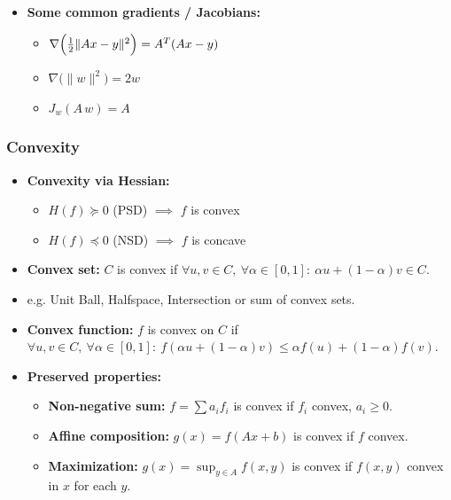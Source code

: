\begin{itemize}
\begin{align}
                  \quad\text{(1st order)},\nonumber                                                 \\
                   & \hspace{-1.5em}f(x)\approx f(x_0)+\langle\nabla f(x_0),\,x-x_0\rangle\nonumber \\
                   & \hspace{-1.5em}\quad+\tfrac12\,(x-x_0)^T\,H(f(x_0))\,(x-x_0)
                  \quad\text{(2nd order)}.\nonumber
            \end{align}
      \item \textbf{Some common gradients / Jacobians:}
            \begin{itemize}
                  \item $\nabla\Bigl(\tfrac12\|Ax-y\|^2\Bigr) = A^T(Ax-y)$
                  \item $\nabla\bigl(\|w\|^2\bigr) = 2w$
                  \item $J_w(A\,w) = A$
            \end{itemize}
\end{itemize}

\subsubsection{Convexity}
\begin{itemize}
      \item \textbf{Convexity via Hessian:}
            \begin{itemize}
                  \item \(H(f)\succeq0\) (PSD) \(\implies\) \(f\) is convex
                  \item \(H(f)\preceq0\) (NSD) \(\implies\) \(f\) is concave
            \end{itemize}
      \item \textbf{Convex set:} $C$ is convex if $\forall u,v\in C,\ \forall \alpha\in[0,1]:\ \alpha u + (1-\alpha)v \in C$.
      \item[] e.g. Unit Ball, Halfspace, Intersection or sum of convex sets.
      \item \textbf{Convex function:} $f$ is convex on $C$ if $\forall u,v\in C,\ \forall \alpha\in[0,1]:\ f(\alpha u + (1-\alpha)v) \leq \alpha f(u) + (1-\alpha)f(v)$.
      \item \textbf{Preserved properties:}
            \begin{itemize}
                \item \textbf{Non-negative sum:} $f = \sum a_i f_i$ is convex if $f_i$ convex, $a_i \geq 0$.
                \item \textbf{Affine composition:} $g(x) = f(Ax + b)$ is convex if $f$ convex.
                \item \textbf{Maximization:} $g(x) = \sup_{y\in A} f(x, y)$ is convex if $f(x, y)$ convex in $x$ for each $y$.
            \end{itemize}
\end{itemize}
